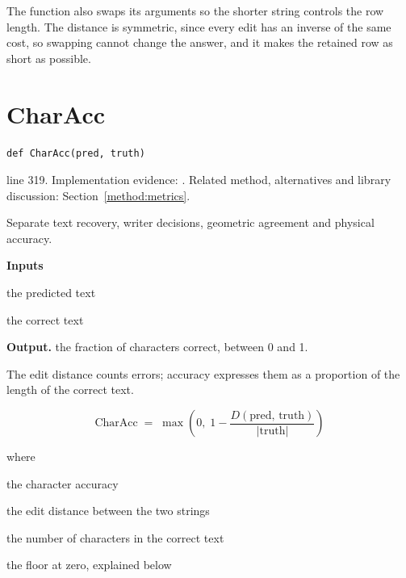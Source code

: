 The function also swaps its arguments so the shorter string controls the row length. The distance is symmetric, since every edit has an inverse of the same cost, so swapping cannot change the answer, and it makes the retained row as short as possible.



\section{CharAcc}\label{fn:recognise:CharAcc}
\begin{lstlisting}[style=sig]
def CharAcc(pred, truth)
\end{lstlisting}
 line 319. Implementation evidence: \cite{code2026}. Related method, alternatives and library discussion: Section~\ref{method:metrics}.


Separate text recovery, writer decisions, geometric agreement and physical accuracy.




\noindent\textbf{Inputs}
\begin{description}[leftmargin=2.2em,style=nextline,font=\normalfont\ttfamily]\setlength\itemsep{1pt}
  \item[{pred}] \normalfont the predicted text
  \item[{truth}] \normalfont the correct text
\end{description}

\noindent\textbf{Output.} the fraction of characters correct, between 0 and 1.


The edit distance counts errors; accuracy expresses them as a proportion of the length of the correct text.


\begin{equation}
\mathrm{CharAcc} \;=\; \max\!\left(0,\; 1 - \frac{D(\mathrm{pred},\,\mathrm{truth})}{|\mathrm{truth}|}\right)
\end{equation}

\noindent where
\begin{description}[leftmargin=2.4em,style=nextline,font=\normalfont\ttfamily]\setlength\itemsep{1pt}
  \item[{$\mathrm{CharAcc}$}] \normalfont the character accuracy
  \item[{$D$}] \normalfont the edit distance between the two strings
  \item[{$|\mathrm{truth}|$}] \normalfont the number of characters in the correct text
  \item[{$\max(0,\,\cdot)$}] \normalfont the floor at zero, explained below
\end{description}

